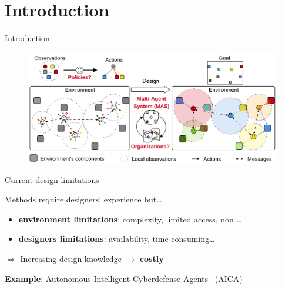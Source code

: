 \AtBeginSection[]{
    \begin{frame}
        \frametitle{}
        \tableofcontents[currentsection]
    \end{frame}
}


\section{Introduction}
\begin{frame}[allowframebreaks]{Introduction}

    \begin{figure}
        \includegraphics[width=0.9\linewidth]{figures/problem_illustration.png}
    \end{figure}

    \begin{alertblock}{Current design limitations}

        Methods require designers' experience but\dots

        \begin{itemize}
            \item \textbf{environment limitations}: complexity, limited access, non \dots
            \item \textbf{designers limitations}: availability, time consuming\dots
        \end{itemize}
        \vspace{1ex}
        $\Longrightarrow$ Increasing design knowledge $\rightarrow$ \textbf{costly}
    \end{alertblock}

    \begin{exampleblock}{\textbf{Example}: Autonomous Intelligent Cyberdefense Agents~\cite{Kott2023} (AICA)}


\end{exampleblock}
\end{frame}
